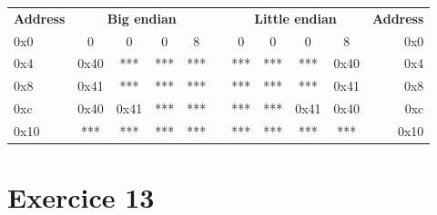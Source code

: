 \documentclass[a4paper,11pt]{report}
\begin{document}
\begin{table}[h]
\centering
\begin{tabular}{lcccclccccr}
\textbf{Address}          & \multicolumn{4}{c}{\textbf{Big endian}}                                                                     &                       & \multicolumn{4}{c}{\textbf{Little endian}}                                                                  & \multicolumn{1}{l}{\textbf{Address}} \\ \cline{2-5} \cline{7-10}
\multicolumn{1}{l|}{0x0}  & \multicolumn{1}{c|}{0}    & \multicolumn{1}{c|}{0}    & \multicolumn{1}{c|}{0}   & \multicolumn{1}{c|}{8}   & \multicolumn{1}{l|}{} & \multicolumn{1}{c|}{0}   & \multicolumn{1}{c|}{0}   & \multicolumn{1}{c|}{0}    & \multicolumn{1}{c|}{8}    & 0x0                                  \\ \cline{2-5} \cline{7-10}
\multicolumn{1}{l|}{0x4}  & \multicolumn{1}{c|}{0x40} & \multicolumn{1}{c|}{***}  & \multicolumn{1}{c|}{***} & \multicolumn{1}{c|}{***} & \multicolumn{1}{l|}{} & \multicolumn{1}{c|}{***} & \multicolumn{1}{c|}{***} & \multicolumn{1}{c|}{***}  & \multicolumn{1}{c|}{0x40} & 0x4                                  \\ \cline{2-5} \cline{7-10}
\multicolumn{1}{l|}{0x8}  & \multicolumn{1}{c|}{0x41} & \multicolumn{1}{c|}{***}  & \multicolumn{1}{c|}{***} & \multicolumn{1}{c|}{***} & \multicolumn{1}{l|}{} & \multicolumn{1}{c|}{***} & \multicolumn{1}{c|}{***} & \multicolumn{1}{c|}{***}  & \multicolumn{1}{c|}{0x41} & 0x8                                  \\ \cline{2-5} \cline{7-10}
\multicolumn{1}{l|}{0xc}  & \multicolumn{1}{c|}{0x40} & \multicolumn{1}{c|}{0x41} & \multicolumn{1}{c|}{***} & \multicolumn{1}{c|}{***} & \multicolumn{1}{l|}{} & \multicolumn{1}{c|}{***} & \multicolumn{1}{c|}{***} & \multicolumn{1}{c|}{0x41} & \multicolumn{1}{c|}{0x40} & 0xc                                  \\ \cline{2-5} \cline{7-10}
\multicolumn{1}{l|}{0x10} & \multicolumn{1}{c|}{***}  & \multicolumn{1}{c|}{***}  & \multicolumn{1}{c|}{***} & \multicolumn{1}{c|}{***} & \multicolumn{1}{l|}{} & \multicolumn{1}{c|}{***} & \multicolumn{1}{c|}{***} & \multicolumn{1}{c|}{***}  & \multicolumn{1}{c|}{***}  & 0x10                                 \\ \cline{2-5} \cline{7-10}
\end{tabular}
\end{table}

\section*{Exercice 13}
\end{document}
